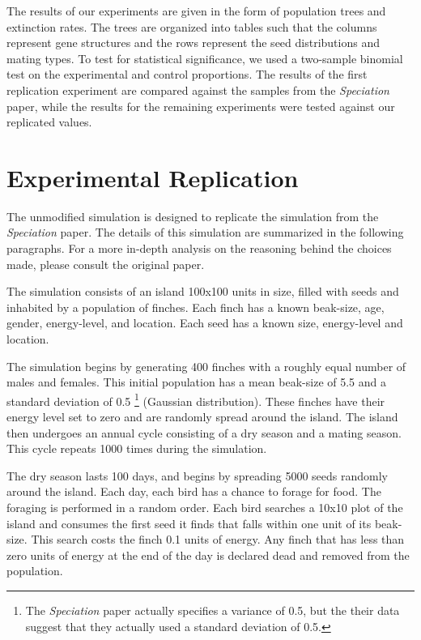 \documentclass[conference]{IEEEtran}
\begin{document}
The results of our experiments are given in the form of population trees and extinction rates. The trees are organized into tables such that the columns represent gene structures and the rows represent the seed distributions and mating types. To test for statistical significance, we used a two-sample binomial test on the experimental and control proportions. The results of the first replication experiment are compared against the samples from the \textit{Speciation} paper, while the results for the remaining experiments were tested against our replicated values. 



\section{Experimental Replication}

The unmodified simulation is designed to replicate the simulation from the \textit{Speciation} paper. The details of this simulation are summarized in the following paragraphs. For a more in-depth analysis on the reasoning behind the choices made, please consult the original paper. 

The simulation consists of an island 100x100 units in size, filled with seeds and inhabited by a population of finches. Each finch has a known beak-size, age, gender, energy-level, and location. Each seed has a known size, energy-level and location.

The simulation begins by generating 400 finches with a roughly equal number of males and females. This initial population has a mean beak-size of 5.5 and a standard deviation of 0.5 \footnote{The \textit{Speciation} paper actually specifies a variance of 0.5, but the their data suggest that they actually used a standard deviation of 0.5.} (Gaussian distribution). These finches have their energy level set to zero and are randomly spread around the island. The island then undergoes an annual cycle consisting of a dry season and a mating season. This cycle repeats 1000 times during the simulation. 

The dry season lasts 100 days, and begins by spreading 5000 seeds randomly around the island. Each day, each bird has a chance to forage for food. The foraging is performed in a random order. Each bird searches a 10x10 plot of the island and consumes the first seed it finds that falls within one unit of its beak-size. This search costs the finch 0.1 units of energy. Any finch that has less than zero units of energy at the end of the day is declared dead and removed from the population.
\end{document}
